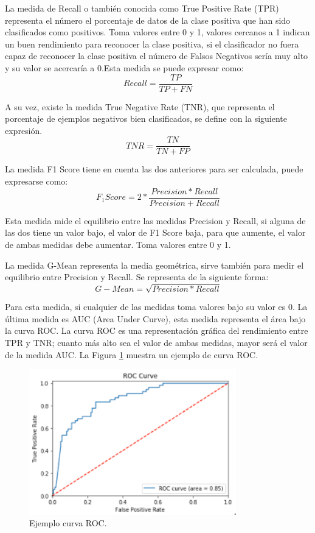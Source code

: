 La medida de Recall o también conocida como True Positive Rate (TPR) representa el número el porcentaje de datos de la clase positiva que han sido clasificados como positivos. Toma valores entre 0 y 1, valores cercanos a 1 indican un buen rendimiento para reconocer la clase positiva, si el clasificador no fuera capaz de reconocer la clase positiva el número de Falsos Negativos sería muy alto y su valor se acercaría a 0.Esta medida se puede expresar como:\newline
$$ Recall = \frac{TP}{TP + FN} $$


A su vez, existe la medida True Negative Rate (TNR), que representa el porcentaje de ejemplos negativos bien clasificados, se define con la siguiente expresión.\newline
$$ TNR = \frac{TN}{TN + FP} $$

La medida F1 Score tiene en cuenta las dos anteriores para ser calculada, puede expresarse como:\newline
$$ F_1 Score = 2 * \frac{Precision*Recall}{Precision+Recall} $$

Esta medida mide el equilibrio entre las medidas Precision y Recall, si alguna de las dos tiene un valor bajo, el valor de F1 Score baja, para que aumente, el valor de ambas medidas debe aumentar. Toma valores entre 0 y 1.\newline

La medida G-Mean representa la media geométrica, sirve también para medir el equilibrio entre Precision y Recall. Se representa de la siguiente forma:\newline
$$ G-Mean = \sqrt{Precision*Recall} $$

Para esta medida, si cualquier de las medidas toma valores bajo su valor es 0.\newline
La última medida es AUC (Area Under Curve), esta medida representa el área bajo la curva ROC. La curva ROC es una representación gráfica del rendimiento entre TPR y TNR; cuanto más alto sea el valor de ambas medidas, mayor será el valor de la medida AUC. La Figura \ref{fig:62} muestra un ejemplo de curva ROC.\newline

\begin{figure}[H]
	\centering
	\includegraphics[width=90mm]{imagenes/auc.png}
	\caption{Ejemplo curva ROC.}
	\label{fig:62}
\end{figure}
\verticalspace

